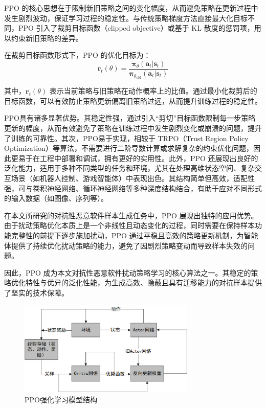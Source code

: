 PPO 的核心思想在于限制新旧策略之间的变化幅度，从而避免策略在更新过程中发生剧烈波动，保证学习过程的稳定性。与传统策略梯度方法直接最大化目标不同，PPO 引入了裁剪目标函数（clipped objective）或基于 KL 散度的惩罚项，用以约束新旧策略的差异。

在裁剪目标函数形式下，PPO 的优化目标为：
\begin{equation}
	\boldsymbol{r}_t(\theta) = \frac{\boldsymbol{\pi}_\theta(\boldsymbol{a}_t | \boldsymbol{s}_t)}{\boldsymbol{\pi}_{\theta_{\text{old}}}(\boldsymbol{a}_t | \boldsymbol{s}_t)}
\end{equation}

其中，\( \boldsymbol{r}_t(\theta) \) 表示当前策略与旧策略在动作概率上的比值。通过最小化裁剪后的目标函数，可以有效防止策略更新偏离旧策略过远，从而提升训练过程的稳定性。

PPO具有诸多显著优势。其稳定性强，通过引入“剪切”目标函数限制每一步策略更新的幅度，从而有效避免了策略在训练过程中发生剧烈变化或崩溃的问题，提升了训练的可靠性。其次，PPO易于实现，相较于 TRPO（Trust Region Policy Optimization）等算法，不需要进行二阶导数计算或求解复杂的约束优化问题，因此更易于在工程中部署和调试，拥有更好的实用性。此外，PPO 还展现出良好的泛化能力，适用于多种不同类型的任务和环境，尤其在处理高维状态空间、复杂交互场景（如机器人控制、游戏智能体）中表现出色。其结构简单但高效，适配性强，可与卷积神经网络、循环神经网络等多种深度结构结合，有助于应对不同形式的输入数据（如图像、序列等）。

在本文所研究的对抗性恶意软件样本生成任务中，PPO 展现出独特的应用优势。由于扰动策略优化本质上是一个非线性且动态变化的过程，同时需要在保持样本功能完整性的前提下逐步施加扰动，PPO 通过平稳且高效的策略更新机制，为智能体提供了持续优化扰动策略的能力，避免了因剧烈策略变动而导致样本失效的问题。

因此，PPO 成为本文对抗性恶意软件扰动策略学习的核心算法之一。其稳定的策略优化特性与优异的泛化性能，为生成高效、隐蔽且具有迁移能力的对抗样本提供了坚实的技术保障。

\begin{figure}[hbt]
	\centering
	\includegraphics[width=0.75\textwidth]{figures/2.6}
	\caption{PPO强化学习模型结构}\label{fig:2.6}
\end{figure}

